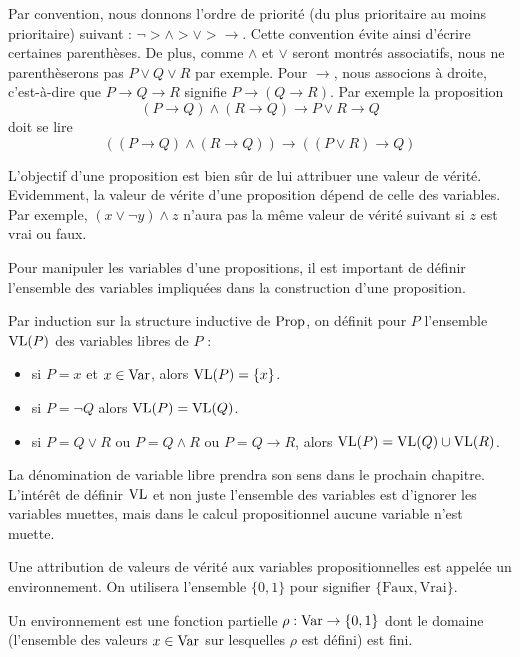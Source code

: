 Par convention, nous donnons l'ordre de priorité (du plus prioritaire au moins
prioritaire) suivant : $\lnot > \land > \lor > \to$. Cette convention évite
ainsi d'écrire certaines parenthèses. De plus, comme $\land$ et $\lor$ seront
montrés associatifs, nous ne parenthèserons pas $P\lor Q\lor R$ par exemple.
Pour $\to$, nous associons à droite, c'est-à-dire que $P\to Q\to R$ signifie
$P\to (Q \to R)$. Par exemple la proposition
\[(P \to Q)\land (R \to Q) \to P\lor R \to Q\] doit se lire
\[((P \to Q) \land (R \to Q)) \to ((P \lor R) \to Q)\]

L'objectif d'une proposition est bien sûr de lui attribuer une valeur de vérité.
Evidemment, la valeur de vérite d'une proposition dépend de celle des variables.
Par exemple, $(x\lor \lnot y) \land z$ n'aura pas la même valeur de vérité
suivant si $z$ est vrai ou faux.

Pour manipuler les variables d'une propositions, il est important de définir
l'ensemble des variables impliquées dans la construction d'une proposition.

\begin{definition}
  Par induction sur la structure inductive de $\operatorname{Prop}$, on définit pour
  $P$ l'ensemble $\operatorname{VL}(P)$ des variables libres de $P$ :
  \begin{itemize}
  \item si $P = x$ et $x\in\operatorname{Var}$, alors $\operatorname{VL}(P) = \{x\}$.
  \item si $P = \lnot Q$ alors $\operatorname{VL}(P) = \operatorname{VL}(Q)$.
  \item si $P = Q \lor R$ ou $P = Q \land R$ ou $P = Q \to R$,
    alors $\operatorname{VL}(P) = \operatorname{VL}(Q)\cup\operatorname{VL}(R)$.
  \end{itemize}
\end{definition}

\begin{remark}
  La dénomination de variable \og libre\fg{} prendra son sens dans le prochain
  chapitre. L'intérêt de définir $\operatorname{VL}$ et non juste l'ensemble des variables est
  d'ignorer les variables muettes, mais dans le calcul propositionnel aucune
  variable n'est muette.
\end{remark}

Une attribution de valeurs de vérité aux variables propositionnelles est appelée
un environnement. On utilisera l'ensemble $\{0,1\}$ pour signifier
$\{\mathrm{Faux},\mathrm{Vrai}\}$.

\begin{definition}[Environnement]
  Un environnement est une fonction partielle $\rho : \operatorname{Var} \to \{0,1\}$
  dont le domaine (l'ensemble des valeurs $x\in \operatorname{Var}$ sur lesquelles
  $\rho$ est défini) est fini.
\end{definition}

